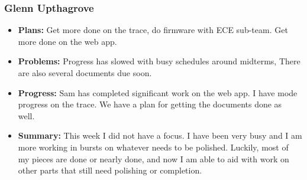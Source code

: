 \documentclass[onecolumn, draftclsnofoot,10pt, compsoc]{IEEEtran}
\begin{document}
\subsubsection{Glenn Upthagrove}
\begin {itemize}
 \item \textbf{Plans: }Get more done on the trace, do firmware with ECE sub-team. Get more done on the web app.
 \item \textbf{Problems: }Progress has slowed with busy schedules around midterms, There are also several documents due soon. 
 \item \textbf{Progress: }Sam has completed significant work on the web app. I have mode progress on the trace. We have a plan for getting the documents done as well. 
 \item \textbf{Summary: }This week I did not have a focus. I have been very busy and I am more working in bursts on whatever needs to be polished. Luckily, most of my pieces are done or nearly done, and now I am able to aid with work on other parts that still need polishing or completion. 
\end {itemize}



%
%
\end{document}
